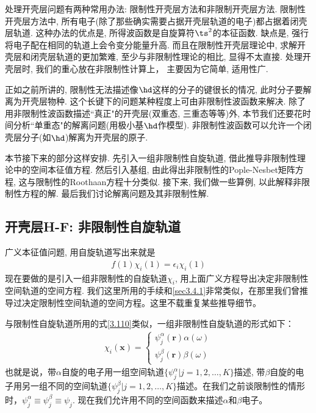 处理开壳层问题有两种常用办法: 限制性开壳层\hft 方法和非限制开壳层\hft 方法. 限制性开壳层方法中, 所有电子(除了那些确实需要占据开壳层轨道的电子)都占据着闭壳层轨道. 这种办法的优点是, 所得波函数是自旋算符$\ts^2$的本征函数. 缺点是, 强行将电子配在相同的轨道上会令变分能量升高. 而且在限制性开壳层\hft 理论中, 求解开壳层和闭壳层轨道的更加繁难, 至少与非限制性\hft 理论的相比, 显得不太直接. 处理开壳层时, 我们的重心放在非限制性计算上， 主要因为它简单, 适用性广.

正如之前所讲的, 限制性\hft  无法描述像$\hd$这样的分子的键很长的情况, 此时分子要解离为开壳层物种. 这个长键下的问题某种程度上可由非限制性波函数来解决. 除了用非限制性波函数描述``真正"的开壳层(双重态, 三重态等等)外, 本节我们还要花时间分析``单重态"的解离问题(用极小基$\hd$作模型). 非限制性波函数可以允许一个闭壳层分子(如$\hd$)解离为开壳层的原子.

本节接下来的部分这样安排. 先引入一组非限制性自旋轨道, 借此推导非限制性\hft 理论中的空间本征值方程. 然后引入基组, 由此得出非限制性的Pople-Nesbet矩阵方程, 这与限制性的Roothaan方程十分类似. 接下来, 我们做一些算例, 以此解释非限制性方程的解. 最后我们讨论解离问题及其非限制性解.
\subsection{开壳层H-F: 非限制性自旋轨道}
广义\hft 本征值问题, 用自旋轨道写出来就是
\begin{align}
f(1)\chi_i(1) = \epsilon_i \chi_i(1)
\end{align}
现在要做的是引入一组非限制性的自旋轨道$\chi_i$, 用上面广义\hft 方程导出决定非限制性空间轨道的空间方程. 我们这里所用的手续和\ref{sec3.4.1}非常类似，在那里我们曾推导过决定限制性空间轨道的空间方程。这里不载重复某些推导细节。

与限制性自旋轨道所用的式\eqref{3.110}类似，一组非限制性自旋轨道的形式如下：
\begin{align}
\chi_i(\mathbf{x}) =
\begin{cases*}
\psi_j^\alpha(\mathbf{r})\alpha(\omega)\\
\psi_j^\beta (\mathbf{r})\beta(\omega)
\end{cases*}
\end{align}
也就是说，带$\alpha$自旋的电子用一组空间轨道$\{\psi_j^\alpha |j=1,2,\ldots,K \}$描述, 带$\beta$自旋的电子用另一组不同的空间轨道$\{\psi_j^\beta |j=1,2,\ldots,K \}$描述。在我们之前谈限制性的情形时，$\psi_j^\alpha \equiv \psi_j^\beta \equiv \psi_j$. 现在我们允许用不同的空间函数来描述$\alpha$和$\beta$电子。

